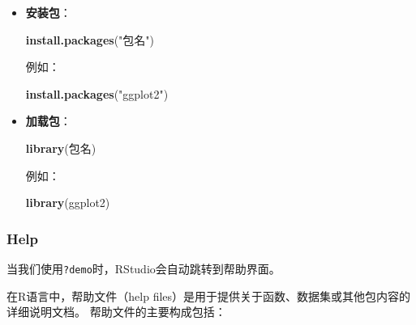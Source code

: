 \documentclass[
]{book}
\newenvironment{Shaded}{\begin{snugshade}}{\end{snugshade}}
\newcommand{\FunctionTok}[1]{\textcolor[rgb]{0.13,0.29,0.53}{\textbf{#1}}}
\newcommand{\NormalTok}[1]{#1}
\newcommand{\StringTok}[1]{\textcolor[rgb]{0.31,0.60,0.02}{#1}}
\begin{document}
\begin{itemize}
\item
  \textbf{安装包}：

\begin{Shaded}
\begin{Highlighting}[]
\FunctionTok{install.packages}\NormalTok{(}\StringTok{"包名"}\NormalTok{)}
\end{Highlighting}
\end{Shaded}

  例如：

\begin{Shaded}
\begin{Highlighting}[]
\FunctionTok{install.packages}\NormalTok{(}\StringTok{"ggplot2"}\NormalTok{)}
\end{Highlighting}
\end{Shaded}
\item
  \textbf{加载包}：

\begin{Shaded}
\begin{Highlighting}[]
\FunctionTok{library}\NormalTok{(包名)}
\end{Highlighting}
\end{Shaded}

  例如：

\begin{Shaded}
\begin{Highlighting}[]
\FunctionTok{library}\NormalTok{(ggplot2)}
\end{Highlighting}
\end{Shaded}
\end{itemize}

\subsubsection{Help}\label{help}

当我们使用\texttt{?demo}时，RStudio会自动跳转到帮助界面。

在R语言中，帮助文件（help files）是用于提供关于函数、数据集或其他包内容的详细说明文档。
帮助文件的主要构成包括：
\end{document}
